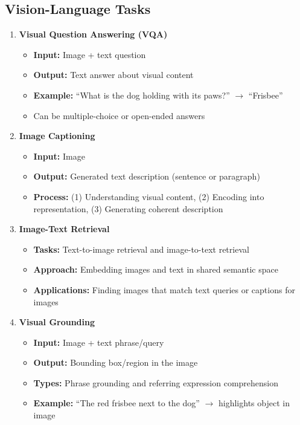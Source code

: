 \subsection*{Vision-Language Tasks}

\begin{enumerate}
    \item \textbf{Visual Question Answering (VQA)}
    \begin{itemize}
        \item \textbf{Input:} Image + text question
        \item \textbf{Output:} Text answer about visual content
        \item \textbf{Example:} ``What is the dog holding with its paws?'' $\rightarrow$ ``Frisbee''
        \item Can be multiple-choice or open-ended answers
    \end{itemize}

    \item \textbf{Image Captioning}
    \begin{itemize}
        \item \textbf{Input:} Image
        \item \textbf{Output:} Generated text description (sentence or paragraph)
        \item \textbf{Process:} (1) Understanding visual content, (2) Encoding into representation, (3) Generating coherent description
    \end{itemize}

    \item \textbf{Image-Text Retrieval}
    \begin{itemize}
        \item \textbf{Tasks:} Text-to-image retrieval and image-to-text retrieval
        \item \textbf{Approach:} Embedding images and text in shared semantic space
        \item \textbf{Applications:} Finding images that match text queries or captions for images
    \end{itemize}

    \item \textbf{Visual Grounding}
    \begin{itemize}
        \item \textbf{Input:} Image + text phrase/query
        \item \textbf{Output:} Bounding box/region in the image
        \item \textbf{Types:} Phrase grounding and referring expression comprehension
        \item \textbf{Example:} ``The red frisbee next to the dog'' $\rightarrow$ highlights object in image
    \end{itemize}


\end{enumerate}

